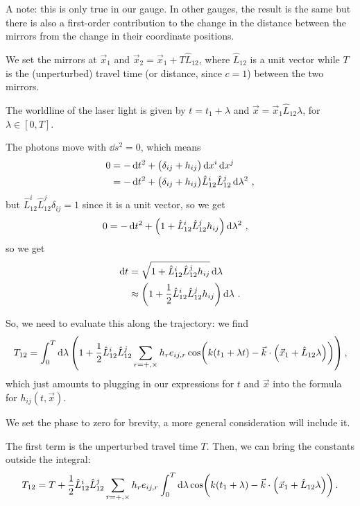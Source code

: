\documentclass[main.tex]{subfiles}
\begin{document}
A note: this is only true in our gauge. In other gauges, the result is the same but there is also a first-order contribution to the change in the distance between the mirrors from the change in their coordinate positions. 

We set the mirrors at \(\vec{x}_{1}\) and \(\vec{x}_{2} = \vec{x}_{1} + T \hat{L}_{12}\), where \(\hat{L}_{12}\) is a unit vector while \(T\) is the (unperturbed) travel time (or distance, since \(c=1\)) between the two mirrors. 

The worldline of the laser light is given by \(t = t_1 + \lambda \) and \(\vec{x} = \vec{x}_{1} \hat{L}_{12} \lambda \), for \(\lambda \in [0,T]\). 

The photons move with \(\dd{s^2} =0\), which means 
%
\begin{align}
0 &= - \dd{t^2} + \qty(\delta_{ij} + h_{ij}) \dd{x^{i}} \dd{x^{j}}  \\
&= - \dd{t^2} + \qty(\delta_{ij} + h_{ij}) \hat{L}_{12}^{i} \hat{L}_{12}^{j} \dd{\lambda^2} 
\,,
\end{align}
%
but \(\hat{L}_{12}^{i} \hat{L}_{12}^{j} \delta_{ij} = 1\) since it is a unit vector, so we get 
%
\begin{align}
0 &= - \dd{t^2} + \qty(1 + \hat{L}_{12}^{i} \hat{L}_{12}^{j} h_{ij})  \dd{\lambda^2}
\,,
\end{align}
%
so we get 
%
\begin{align}
\dd{t} &= \sqrt{1 + \hat{L}_{12}^{i} \hat{L}_{12}^{j} h_{ij}} \dd{\lambda }  \\
& \approx \qty(1 + \frac{1}{2} \hat{L}_{12}^{i} \hat{L}_{12}^{j} h_{ij}) \dd{\lambda }
\,.
\end{align}

So, we need to evaluate this along the trajectory: we find 
%
\begin{align}
T_{12} = \int_{0}^{T} \dd{\lambda } \qty(1 + \frac{1}{2} \hat{L}_{12}^{i} \hat{L}_{12}^{j} \sum _{r = +, \times } h_{r} e_{ij, r} \cos(k (t_1 + \lambda t) - \vec{k} \cdot \qty(\vec{x}_{1} + \hat{L}_{12} \lambda )))
\,,
\end{align}
%
which just amounts to plugging in our expressions for \(t\) and \(\vec{x}\) into the formula for \(h_{ij} (t, \vec{x})\). 

We set the phase to zero for brevity, a more general consideration will include it. 

The first term is the unperturbed travel time  \(T\). Then, we can bring the constants outside the integral: 
%
\begin{align}
T_{12} = T + \frac{1}{2} \hat{L}_{12}^{i} \hat{L}_{12}^{j} \sum _{r = +, \times } h_{r} e_{ij, r}  \int_{0}^{T} \dd{\lambda }  \cos(k (t_1 + \lambda ) - \vec{k} \cdot \qty(\vec{x}_{1} + \hat{L}_{12} \lambda ))
\,.
\end{align}
\end{document}
